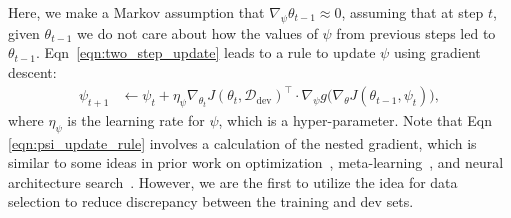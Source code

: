 Here, we make a Markov assumption that $\nabla_\psi \theta_{t-1} \approx 0$, assuming that at step $t$, given $\theta_{t-1}$ we do not care about how the values of $\psi$ from previous steps led to $\theta_{t-1}$. Eqn~\ref{eqn:two_step_update} leads to a rule to update $\psi$ using gradient descent:
\begin{equation}
  \label{eqn:psi_update_rule}
  \begin{aligned}
    \psi_{t+1} 
      &\leftarrow \psi_t + \eta_\psi \nabla_{\theta_t} J(\theta_t, \mathcal{D}_\text{dev})^\top \cdot \nabla_\psi g\big( \nabla_\theta J(\theta_{t-1}, \psi_t) \big),
  \end{aligned}
\end{equation}
where $\eta_\psi$ is the learning rate for $\psi$, which is a hyper-parameter. Note that Eqn \ref{eqn:psi_update_rule} involves a calculation of the nested gradient, which is similar to some ideas in prior work on optimization~\citep{hyper_grad}, meta-learning~\citep{finn2017model}, and neural architecture search~\citep{darts}. 
However, we are the first to utilize the idea for data selection to reduce discrepancy between the training and dev sets. 

